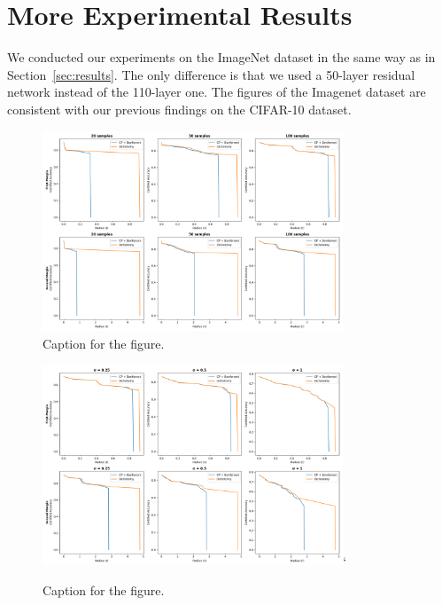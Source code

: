 \section{More Experimental Results}\label{sec:more-experimental-results}
We conducted our experiments on the ImageNet dataset in the same way as in Section~\ref{sec:results}.
The only difference is that we used a 50-layer residual network instead of the 110-layer one.
The figures of the Imagenet dataset are consistent with our previous findings on the CIFAR-10 dataset.
\begin{figure}[htbp]
    \centering
    \includegraphics[width=0.8\textwidth]{images/discrete_num_imagenet}
    \caption{Caption for the figure.}
    \label{fig:discrete_num_imagenet}
\end{figure}
\begin{figure}[htbp]
    \centering
    \includegraphics[width=0.8\textwidth]{images/discrete_sigma_imagenet}`
    \caption{Caption for the figure.}
    \label{fig:discrete_sigma_imagenet}
\end{figure}
